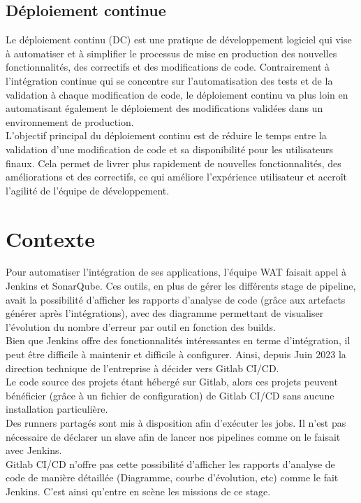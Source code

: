 	\subsection{Déploiement continue}
		Le déploiement continu (DC) est une pratique de développement logiciel qui vise à automatiser et à simplifier le processus de mise en production des nouvelles fonctionnalités, des correctifs et des modifications de code. Contrairement à l'intégration continue qui se concentre sur l'automatisation des tests et de la validation à chaque modification de code, le déploiement continu va plus loin en automatisant également le déploiement des modifications validées dans un environnement de production.\\
		
		L'objectif principal du déploiement continu est de réduire le temps entre la validation d'une modification de code et sa disponibilité pour les utilisateurs finaux. Cela permet de livrer plus rapidement de nouvelles fonctionnalités, des améliorations et des correctifs, ce qui améliore l'expérience utilisateur et accroît l'agilité de l'équipe de développement.\\
	\section{Contexte}		
		
		Pour automatiser l'intégration de ses applications, l'équipe WAT faisait appel à Jenkins et SonarQube. Ces outils, en plus de gérer les différents stage de pipeline, avait la possibilité d'afficher les rapports d'analyse de code (grâce aux artefacts générer après l'intégrations), avec des diagramme permettant de visualiser l'évolution du nombre d'erreur par outil en fonction des builds.\\
		
		Bien que Jenkins offre des fonctionnalités intéressantes en terme d'intégration, il peut être difficile à maintenir et difficile à configurer. Ainsi, depuis Juin 2023 la direction technique de l'entreprise à décider vers Gitlab CI/CD.\\
		
		Le code source des projets étant hébergé sur Gitlab, alors ces projets peuvent bénéficier (grâce à un fichier de configuration) de Gitlab CI/CD sans aucune installation particulière.\\
		Des runners partagés sont mis à disposition afin d’exécuter les jobs. Il n'est pas nécessaire de déclarer un slave afin de lancer nos pipelines comme on le faisait avec Jenkins.\\
		Gitlab CI/CD n'offre pas cette possibilité d'afficher les rapports d'analyse de code de manière détaillée (Diagramme, courbe d'évolution, etc) comme le fait Jenkins.
		C'est ainsi qu'entre en scène les missions de ce stage.
		
